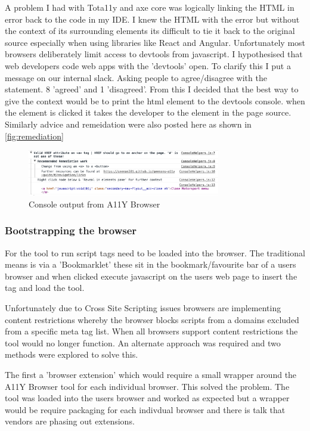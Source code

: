 A problem I had with Tota11y and axe core was logically linking the HTML in
error back to the code in my IDE. I knew the HTML with the error but
without the context of its surrounding elements its difficult to tie it back
to the original source especially when using libraries like React and Angular.
Unfortunately most browsers deliberately limit access to devtools from
javascript. I hypothesised that web developers code web apps with the
'devtools' open. To clarify this I put a message on our internal slack.
Asking people to agree/disagree with the statement. 8 'agreed' and 1 'disagreed'.
From this I decided that the best way to give the context would be to print
the html element to the devtools console. when the element is clicked it takes
the developer to the element in the page source. Similarly advice and
remeidation were also posted here as shown in \ref{fig:remediation}

\begin{figure}[H]
\centering
\includegraphics[width=0.75\textwidth]{figures/a11y_tool_remediation}
\captionsetup{justification=centering}
\caption{Console output from A11Y Browser
\label{fig:a11y_tool_remediation}}
\end{figure}

\subsubsection{Bootstrapping the browser}
For the tool to run script tags need to be loaded into the browser. The traditional means is via a
'Bookmarklet' these sit in the bookmark/favourite bar of a users
browser and when clicked execute javascript on the users web page to insert the
 tag and load the tool.

Unfortunately due to Cross Site Scripting issues browsers are implementing
content restrictions whereby the browser blocks scripts from a
domains excluded from a specific meta tag list. When all browsers support
content restrictions the tool would no longer function. An alternate approach
was required and two methods were explored to solve this.

The first a 'browser extension' which would require a small wrapper around
the A11Y Browser tool for each individual browser. This solved the problem.
The tool was loaded into the users browser and worked as expected but a
wrapper would be require packaging for each indivdual browser and there is
talk that vendors are phasing out extensions.

